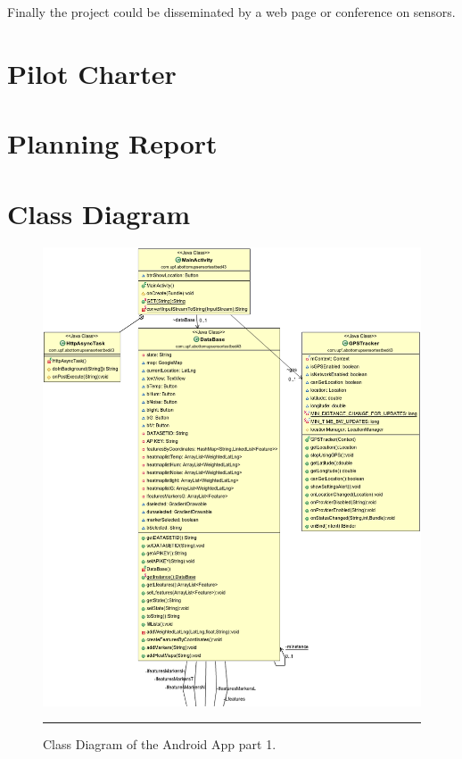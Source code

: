 \documentclass[12pt, a4paper,twoside]{tesi_upf}
\begin{document}
  Finally the project could be disseminated by a web page or conference on sensors.


{}
\cleardoublepage

\appendix
\label{Appendixes}

	\chapter{Pilot Charter}
	\label{PilotCharter}
  	
	
	\chapter{Planning Report}
	\label{PlanningReport}
  	
  	
  \chapter{Class Diagram}
	\clearpage
		\begin{figure}[H]
      \centering
        \includegraphics[scale=0.5]{./Figures/ClassDiagram1_1.png}
      \rule{35em}{0.5pt}
      \caption[Class Diagram of the Android App part 1]{Class Diagram of the Android App part 1.}
      \label{fig:ClassDiagram1}
    \end{figure}
		
\end{document}
